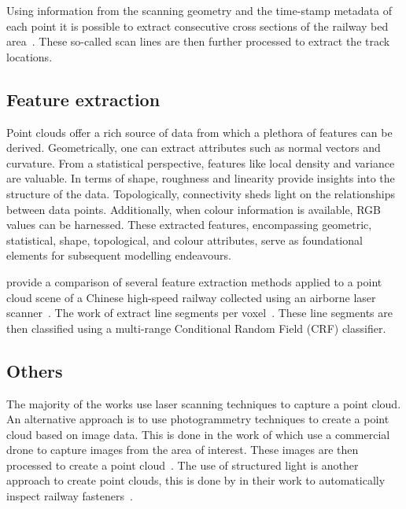Using information from the scanning geometry and the time-stamp metadata of each point it is possible to extract consecutive cross sections of the railway bed area~\cite{yang2014automated}. These so-called scan lines are then further processed to extract the track locations.

\subsection{Feature extraction}
Point clouds offer a rich source of data from which a plethora of features can be derived. Geometrically, one can extract attributes such as normal vectors and curvature. From a statistical perspective, features like local density and variance are valuable. In terms of shape, roughness and linearity provide insights into the structure of the data. Topologically, connectivity sheds light on the relationships between data points. Additionally, when colour information is available, RGB values can be harnessed. These extracted features, encompassing geometric, statistical, shape, topological, and colour attributes, serve as foundational elements for subsequent modelling endeavours.

\citeauthor{geng2020comparison} provide a comparison of several feature extraction methods applied to a point cloud scene of a Chinese high-speed railway collected using an airborne laser scanner~\cite{geng2020comparison}. The work of \citeauthor{jung2016multi-range} extract line segments per voxel~\cite{jung2016multi-range}. These line segments are then classified using a multi-range Conditional Random Field (CRF) classifier.

\subsection{Others}
The majority of the works use laser scanning techniques to capture a point cloud. An alternative approach is to use photogrammetry techniques to create a point cloud based on image data. This is done in the work of \citeauthor{sahebdivani2020rail} which use a commercial drone to capture images from the area of interest. These images are then processed to create a point cloud~\cite{sahebdivani2020rail}. The use of structured light is another approach to create point clouds, this is done by \citeauthor{cui2020real-time} in their work to automatically inspect railway fasteners~\cite{cui2020real-time}. 

